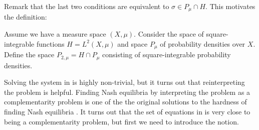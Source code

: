 \begin{comment}
\begin{equation}
      \label{eq:KKT_total}
  \begin{split}
  \begin{pmatrix}
    \nabla_{\sigma_1} U_1 \mid{\sigma_1 = \overbar{\sigma}_1} \\
    \vdots \\
    \nabla_{\sigma_N} U_N \mid{\sigma_N = \overbar{\sigma}_N}
\end{pmatrix} + \begin{pmatrix}
    \mu_1 \\
    \vdots \\
    \mu_N
\end{pmatrix} + \begin{pmatrix}
    \lambda_1 \cdot 1_k \\
    \vdots \\
    \lambda_N \cdot 1_k
\end{pmatrix} = 0 \\
\ip{
\begin{pmatrix}
  \mu_1 \\
  \vdots \\
  \mu_N
\end{pmatrix}}{ \begin{pmatrix}
  \sigma_1 \\
  \vdots \\
  \sigma_N
\end{pmatrix}} = 0 \\
\mu_i \in H_+ \\
  \sigma_i \in H_+ \\
  \int \sigma_i d\mu = 1
  \end{split}
\end{equation}
\end{comment}
Remark that the last two conditions are equivalent to $\sigma \in P_{\mu} \cap H$. This motivates the definition:
\begin{definition}
  Assume we have a measure space $(X,\mu)$. Consider the space of square-integrable functions $H=L^2(X,\mu)$ and space $P_{\mu}$ of probability densities over $X$. Define the space $P_{2,\mu}=H \cap P_{\mu}$ consisting of square-integrable probability densities.
\end{definition}
Solving the system in  is highly non-trivial, but it turns out that reinterpreting the problem is helpful.
Finding Nash equilibria by interpreting the problem as a complementarity problem is one of the the original solutions to the hardness of finding Nash equilibria  \citep{karamardian1969nonlinear}. It turns out that the set of equations in  is very close to being a complementarity problem, but first we need to introduce the notion.
